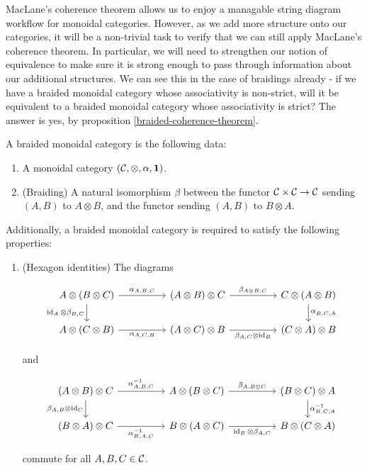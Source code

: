 \begin{rem}
MacLane's coherence theorem allows us to enjoy a managable string diagram workflow for monoidal categories. However, as we add more structure onto our categories, it will be a non-trivial task to verify that we can still apply MacLane's coherence theorem. In particular, we will need to strengthen our notion of equivalence to make sure it is strong enough to pass through information about our additional structures. We can see this in the case of braidings already - if we have a braided monoidal category whose associativity is non-strict, will it be equivalent to a braided monoidal category whose associativity is strict? The answer is yes, by proposition \ref{braided-coherence-theorem}.
\end{rem}


\begin{defn} A braided monoidal category is the following data:

\begin{enumerate}
\item A monoidal category $({\mathcal C},\otimes,\alpha, {\mathbf 1})$.
\item (Braiding) A natural isomorphism $\beta$ between the functor ${\mathcal C}\times {\mathcal C}\to {\mathcal C}$ sending $(A,B)$ to $A\otimes B$, and the functor sending $(A,B)$ to $B\otimes A$.
\end{enumerate}

Additionally, a braided monoidal category is required to satisfy the following properties:

\begin{enumerate}
\item (Hexagon identities) The diagrams

\[\begin{tikzcd}
	{A\otimes (B\otimes C)} && {(A\otimes B)\otimes C} && {C\otimes (A\otimes B)} \\
	{A\otimes (C\otimes B)} && {(A\otimes C)\otimes B} && {(C\otimes A)\otimes B}
	\arrow["{\alpha_{A,B,C}}", from=1-1, to=1-3]
	\arrow["{\beta_{A\otimes B,C}}", from=1-3, to=1-5]
	\arrow["{\alpha^{}_{B,C,A}}", from=1-5, to=2-5]
	\arrow["{\id_A\otimes \beta_{B,C}}"', from=1-1, to=2-1]
	\arrow["{\alpha_{A,C,B}}"', from=2-1, to=2-3]
	\arrow["{\beta_{A,C}\otimes \id_B}"', from=2-3, to=2-5]
\end{tikzcd}\]

and

\[\begin{tikzcd}
	{(A\otimes B)\otimes C} && {A\otimes (B\otimes C)} && {(B\otimes C)\otimes A} \\
	{(B\otimes A)\otimes C} && {B\otimes (A\otimes C)} && {B\otimes (C\otimes A)}
	\arrow["{\alpha^{-1}_{A,B,C}}", from=1-1, to=1-3]
	\arrow["{\beta_{A,B\otimes C}}", from=1-3, to=1-5]
	\arrow["{\alpha^{-1}_{B,C,A}}", from=1-5, to=2-5]
	\arrow["{\beta_{A,B}\otimes \id_C}"', from=1-1, to=2-1]
	\arrow["{\alpha^{-1}_{B,A,C}}"', from=2-1, to=2-3]
	\arrow["{\id_B\otimes \beta_{A,C}}"', from=2-3, to=2-5]
\end{tikzcd}\]

commute for all $A,B,C\in {\mathcal C}$.
\end{enumerate}
\end{defn}

